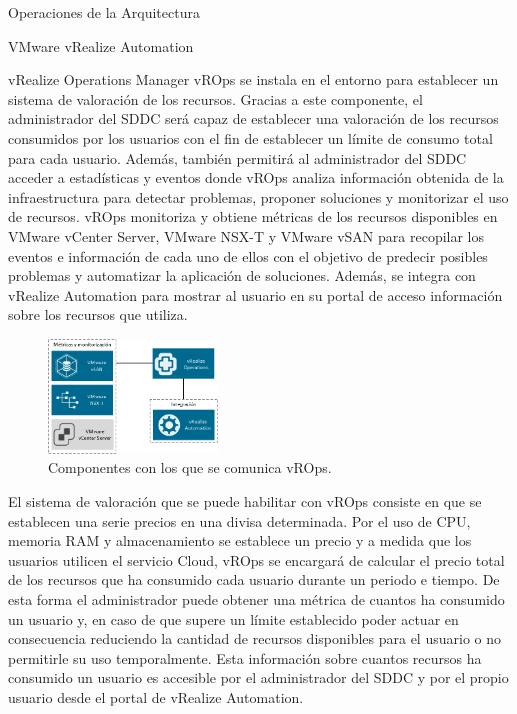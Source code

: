 \begin{subsection}{Operaciones de la Arquitectura}
\begin{subsubsection}{VMware vRealize Automation}
    \end{subsubsection}
    \begin{subsubsection}{vRealize Operations Manager}
        vROps se instala en el entorno para establecer un sistema de valoración de los recursos. Gracias a este componente, el administrador del SDDC será capaz de establecer una valoración de los recursos consumidos por los usuarios con el fin de establecer un límite de consumo total para cada usuario. Además, también permitirá al administrador del SDDC acceder a estadísticas y eventos donde vROps analiza información obtenida de la infraestructura para detectar problemas, proponer soluciones y monitorizar el uso de recursos. vROps monitoriza y obtiene métricas de los recursos disponibles en VMware vCenter Server, VMware NSX-T y VMware vSAN para recopilar los eventos e información de cada uno de ellos con el objetivo de predecir posibles problemas y automatizar la aplicación de soluciones. Además, se integra con vRealize Automation para mostrar al usuario en su portal de acceso información sobre los recursos que utiliza.
        \\
        \begin{figure}[h]
            \centering
            \includegraphics[width=0.4\textwidth]{imaxes/pruebaconcepto/vrealize/estructura-vrops.png}
            \caption{Componentes con los que se comunica vROps.}
            \label{fig:vrops-components}
        \end{figure}
        \FloatBarrier
        El sistema de valoración que se puede habilitar con vROps consiste en que se establecen una serie precios en una divisa determinada. Por el uso de CPU, memoria RAM y almacenamiento se establece un precio y a medida que los usuarios utilicen el servicio Cloud, vROps se encargará de calcular el precio total de los recursos que ha consumido cada usuario durante un periodo e tiempo. De esta forma el administrador puede obtener una métrica de cuantos ha consumido un usuario y, en caso de que supere un límite establecido poder actuar en consecuencia reduciendo la cantidad de recursos disponibles para el usuario o no permitirle su uso temporalmente. Esta información sobre cuantos recursos ha consumido un usuario es accesible por el administrador del SDDC y por el propio usuario desde el portal de vRealize Automation.

\end{subsubsection}
\end{subsection}
